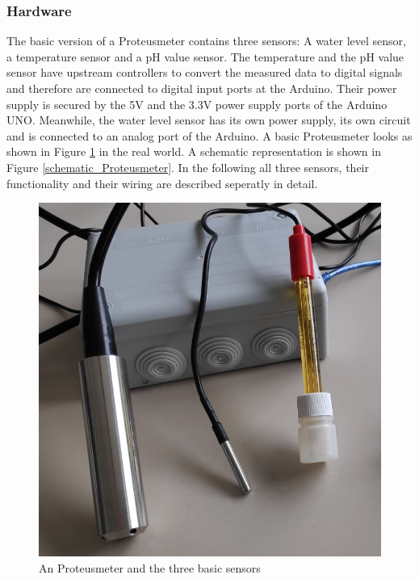 \documentclass[11pt, letterpaper]{article}
\begin{document}
\subsubsection{Hardware}
The basic version of a Proteusmeter contains three sensors: A water level sensor, a temperature sensor and a pH value sensor. The temperature and the pH value sensor have upstream controllers to convert the measured data to digital signals and therefore are connected to digital input ports at the Arduino. Their power supply is secured by the 5V and the 3.3V power supply ports of the Arduino UNO. Meanwhile, the water level sensor has its own power supply, its own circuit and is connected to an analog port of the Arduino. A basic Proteusmeter looks as shown in Figure \ref{Proteusmeter} in the real world. A schematic representation is shown in Figure \ref{schematic_Proteusmeter}. In the following all three sensors, their functionality and their wiring are described seperatly in detail.
\begin{figure}[ht!]
	\centering
	\includegraphics[width=120mm]{figures/box.jpg}
	\caption{An Proteusmeter and the three basic sensors \label{Proteusmeter}}
\end{figure}
\newline
\newline
\newline
\newline
\newline
\end{document}
